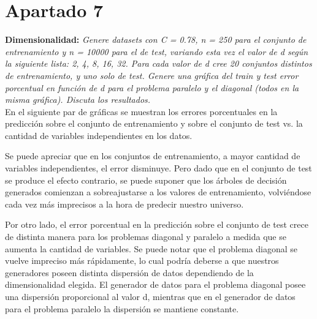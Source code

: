 \documentclass[a4paper, 11pt]{article} %
\begin{document}

\section*{Apartado 7}
\textbf{Dimensionalidad: }\textit{Genere datasets con C = 0.78, n = 250 para
el conjunto de entrenamiento y n = 10000 para el de test, variando esta vez el
valor de d según la siguiente lista: 2, 4, 8, 16, 32. Para cada valor de d cree
20 conjuntos distintos de entrenamiento, y uno solo de test. Genere una gráfica
del train y test error porcentual en función de d para el problema paralelo y
el diagonal (todos en la misma gráfica). Discuta los resultados.}\\

En el siguiente par de gráficas se muestran los errores porcentuales en la
predicción sobre el conjunto de entrenamiento y sobre el conjunto de test vs.
la cantidad de variables independientes en los datos.

Se puede apreciar que en los conjuntos de entrenamiento, a mayor cantidad de
variables independientes, el error disminuye. Pero dado que en el conjunto de
test se produce el efecto contrario, se puede suponer que los árboles de
decisión generados comienzan a sobreajustarse a los valores de entrenamiento,
volviéndose cada vez más imprecisos a la hora de predecir nuestro universo.

Por otro lado, el error porcentual en la predicción sobre el conjunto de test
crece de distinta manera para los problemas diagonal y paralelo a medida que se
aumenta la cantidad de variables. Se puede notar que el problema diagonal se
vuelve impreciso más rápidamente, lo cual podría deberse a que nuestros
generadores poseen distinta dispersión de datos dependiendo de la
dimensionalidad elegida. El generador de datos para el problema diagonal posee
una dispersión proporcional al valor d, mientras que en el generador de datos
para el problema paralelo la dispersión se mantiene constante.
\end{document}

